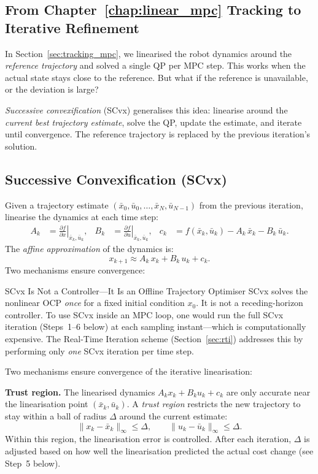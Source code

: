 \subsection{From Chapter~\ref{chap:linear_mpc} Tracking to Iterative Refinement}

In Section~\ref{sec:tracking_mpc}, we linearised the robot dynamics around the \emph{reference trajectory} and solved a single QP per MPC step. This works when the actual state stays close to the reference. But what if the reference is unavailable, or the deviation is large?

\emph{Successive convexification} (SCvx) generalises this idea: linearise around the \emph{current best trajectory estimate}, solve the QP, update the estimate, and iterate until convergence. The reference trajectory is replaced by the previous iteration's solution.

\subsection{Successive Convexification (SCvx)}
\label{sec:scvx}

Given a trajectory estimate $(\bar{x}_0, \bar{u}_0, \dots, \bar{x}_N, \bar{u}_{N-1})$ from the previous iteration, linearise the dynamics at each time step:
\begin{align*}
	A_k &= \left.\frac{\partial f}{\partial x}\right|_{\bar{x}_k, \bar{u}_k}, &
	B_k &= \left.\frac{\partial f}{\partial u}\right|_{\bar{x}_k, \bar{u}_k}, &
	c_k &= f(\bar{x}_k, \bar{u}_k) - A_k\,\bar{x}_k - B_k\,\bar{u}_k.
\end{align*}
The \emph{affine approximation} of the dynamics is:
\[
x_{k+1} \approx A_k\, x_k + B_k\, u_k + c_k.
\]
Two mechanisms ensure convergence:

\begin{alertbox}{SCvx Is Not a Controller---It Is an Offline Trajectory Optimiser}
	SCvx solves the nonlinear OCP \emph{once} for a fixed initial condition $x_0$. It is not a receding-horizon controller. To use SCvx inside an MPC loop, one would run the full SCvx iteration (Steps~1--6 below) at each sampling instant---which is computationally expensive. The Real-Time Iteration scheme (Section~\ref{sec:rti}) addresses this by performing only \emph{one} SCvx iteration per time step.
\end{alertbox}

Two mechanisms ensure convergence of the iterative linearisation:

\textbf{Trust region.} The linearised dynamics $A_k x_k + B_k u_k + c_k$ are only accurate near the linearisation point $(\bar{x}_k, \bar{u}_k)$. A \emph{trust region} restricts the new trajectory to stay within a ball of radius $\Delta$ around the current estimate:
\[
\|x_k - \bar{x}_k\|_\infty \le \Delta, \qquad \|u_k - \bar{u}_k\|_\infty \le \Delta.
\]
Within this region, the linearisation error is controlled. After each iteration, $\Delta$ is adjusted based on how well the linearisation predicted the actual cost change (see Step~5 below).

